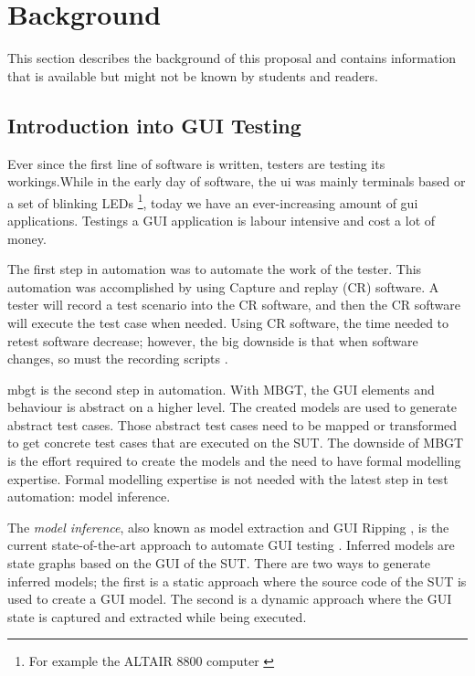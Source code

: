 \section{Background} \label{background}
This section describes the background of this proposal and contains information that is available but might not be known by students and readers. 

\subsection{Introduction into GUI Testing}
Ever since the first line of software is written, testers are testing its workings.While in the early day of software, the \acrfull{ui} was mainly terminals based or a set of blinking LEDs \cite{altair8800} \footnote{For example the ALTAIR 8800 computer \cite{altair8800}}, today we have an ever-increasing amount of \acrfull{gui} applications. Testings a GUI application is labour intensive and cost a lot of money. \cite{gui-history}

The first step in automation was to automate the work of the tester. This automation was accomplished by using Capture and replay (CR) software. A tester will record a test scenario into the CR software, and then the CR software will execute the test case when needed. Using CR software, the time needed to retest software decrease; however, the big downside is that when software changes, so must the recording scripts \cite{gui-history}.

\acrfull{mbgt} is the second step in automation. With MBGT, the GUI elements and behaviour is abstract on a higher level. The created models are used to generate abstract test cases. Those abstract test cases need to be mapped or transformed to get concrete test cases that are executed on the SUT. The downside of MBGT is the effort required to create the models and the need to have formal modelling expertise. Formal modelling expertise is not needed with the latest step in test automation: model inference. 

The \emph{model inference}, also known as model extraction and GUI Ripping \cite{gui-ripping}, is the current state-of-the-art approach to automate GUI testing \cite{gui-history}. Inferred models are state graphs based on the GUI of the SUT. There are two ways to generate inferred models; the first is a static approach where the source code of the SUT is used to create a GUI model. The second is a dynamic approach where the GUI state is captured and extracted while being executed. 

